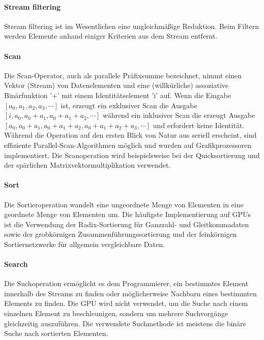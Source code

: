 \documentclass[10pt,twocolumn]{article}          %
\begin{document}
\paragraph{Stream filtering} Stream filtering ist im Wesentlichen eine ungleichm\"aßige Reduktion. 
Beim Filtern werden Elemente anhand einiger Kriterien aus dem Stream entfernt.

\paragraph{Scan} Die Scan-Operator, auch als parallele Pr\"afixsumme bezeichnet, nimmt einen Vektor (Stream) von Datenelementen und eine (willk\"urliche) assoziative Bin\"arfunktion '+' mit einem Identit\"atselement 'i' auf. 
Wenn die Eingabe $[a_0, a_1, a_2, a_3, \cdots]$ ist, erzeugt ein exklusiver Scan die Ausgabe $[i, a_0, a_0 + a_1, a_0 + a_1 + a_2, \cdots]$ w\"ahrend ein inklusiver Scan die erzeugt Ausgabe $[a_0, a_0 + a_1, a_0 + a_1 + a_2, a_0 + a_1 + a_2 + a_3, \cdots ]$ und erfordert keine Identit\"at. W\"ahrend die Operation auf den ersten Blick von Natur aus seriell erscheint, sind effiziente Parallel-Scan-Algorithmen m\"oglich und wurden auf Grafikprozessoren implementiert. Die Scanoperation wird beispielsweise bei der Quicksortierung und der sp\"arlichen Matrixvektormultiplikation verwendet.

\paragraph{Sort} Die Sortieroperation wandelt eine ungeordnete Menge von Elementen in eine geordnete Menge von Elementen um. 
Die h\"aufigste Implementierung auf GPUs ist die Verwendung der Radix-Sortierung f\"ur Ganzzahl- und Gleitkommadaten sowie der grobk\"ornigen Zusammenf\"uhrungssortierung und der feink\"ornigen Sortiernetzwerke f\"ur allgemein vergleichbare Daten.

\paragraph{Search} Die Suchoperation erm\"oglicht es dem Programmierer, ein bestimmtes Element innerhalb des Streams zu finden oder m\"oglicherweise Nachbarn eines bestimmten Elements zu finden. 
Die GPU wird nicht verwendet, um die Suche nach einem einzelnen Element zu beschleunigen, sondern um mehrere Suchvorg\"ange gleichzeitig auszuf\"uhren. 
Die verwendete Suchmethode ist meistens die bin\"are Suche nach sortierten Elementen.
\end{document}
